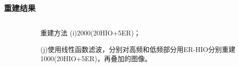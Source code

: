 \documentclass[12pt,aspectratio=169]{beamer} %
\begin{document}
\begin{frame}
    \frametitle{重建结果}
    \begin{columns}
        \begin{column}{0.7\textwidth}
            \begin{figure}
                \qquad
            \end{figure}
        \end{column}
        \begin{column}{0.3\textwidth}
            \begin{block}{重建方法}
                (i)2000(20HIO+5ER)；
                
                (j)使用线性函数滤波，分别对高频和低频部分用ER-HIO分别重建1000(20HIO+5ER)，再叠加的图像。
            \end{block}
        \end{column}
    \end{columns}
\end{frame}
\end{document}
